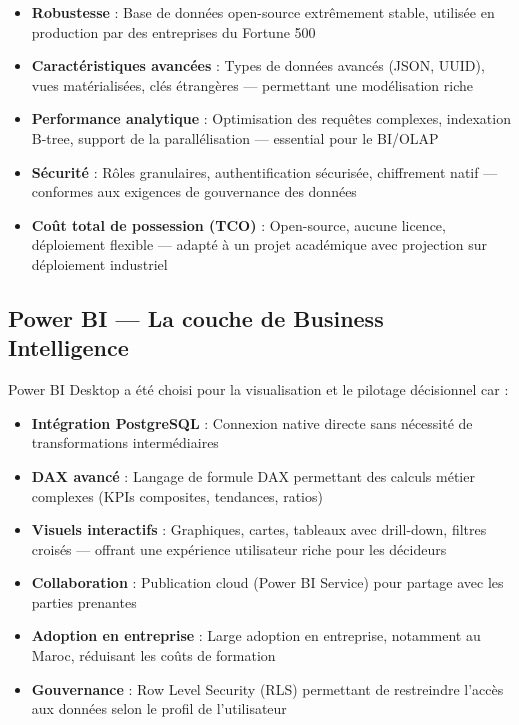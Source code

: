 \documentclass[a4paper,12pt]{report}
\begin{document}
\begin{itemize}
    \item \textbf{Robustesse} : Base de données open-source extrêmement stable, utilisée en production par des entreprises du Fortune 500
    \item \textbf{Caractéristiques avancées} : Types de données avancés (JSON, UUID), vues matérialisées, clés étrangères — permettant une modélisation riche
    \item \textbf{Performance analytique} : Optimisation des requêtes complexes, indexation B-tree, support de la parallélisation — essential pour le BI/OLAP
    \item \textbf{Sécurité} : Rôles granulaires, authentification sécurisée, chiffrement natif — conformes aux exigences de gouvernance des données
    \item \textbf{Coût total de possession (TCO)} : Open-source, aucune licence, déploiement flexible — adapté à un projet académique avec projection sur déploiement industriel
\end{itemize}

\subsection{Power BI — La couche de Business Intelligence}

Power BI Desktop a été choisi pour la visualisation et le pilotage décisionnel car :

\begin{itemize}
    \item \textbf{Intégration PostgreSQL} : Connexion native directe sans nécessité de transformations intermédiaires
    \item \textbf{DAX avancé} : Langage de formule DAX permettant des calculs métier complexes (KPIs composites, tendances, ratios)
    \item \textbf{Visuels interactifs} : Graphiques, cartes, tableaux avec drill-down, filtres croisés — offrant une expérience utilisateur riche pour les décideurs
    \item \textbf{Collaboration} : Publication cloud (Power BI Service) pour partage avec les parties prenantes
    \item \textbf{Adoption en entreprise} : Large adoption en entreprise, notamment au Maroc, réduisant les coûts de formation
    \item \textbf{Gouvernance} : Row Level Security (RLS) permettant de restreindre l'accès aux données selon le profil de l'utilisateur
\end{itemize}
\end{document}
